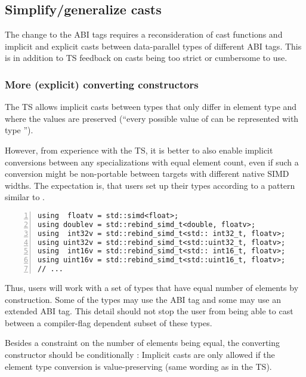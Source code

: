 \subsection{Simplify/generalize casts}\label{sec:casts}

The change to the ABI tags requires a reconsideration of cast functions and
implicit and explicit casts between data-parallel types of different ABI tags.
This is in addition to TS feedback on casts being too strict or cumbersome to use.

\subsubsection{More (explicit) converting constructors}

The TS allows implicit casts between  types that only
differ in element type and where the values are preserved (“every possible
value of  can be represented with type ”).

However, from experience with the TS, it is better to also enable implicit
conversions between any  specializations with equal element count,
even if such a conversion might be non-portable between targets with different
native SIMD widths.
The expectation is, that users set up their types according to a pattern
similar to .
\begin{lstlisting}[numbers=left,float={hbtp},label=lst:simdtypespattern,caption={
  Recommended setup of \code{simd} types
}]
using  floatv = std::simd<float>;
using doublev = std::rebind_simd_t<double, floatv>;
using  int32v = std::rebind_simd_t<std:: int32_t, floatv>;
using uint32v = std::rebind_simd_t<std::uint32_t, floatv>;
using  int16v = std::rebind_simd_t<std:: int16_t, floatv>;
using uint16v = std::rebind_simd_t<std::uint16_t, floatv>;
// ...
\end{lstlisting}
Thus, users will work with a set of types that have equal number of elements by
construction.
Some of the types may use the  ABI tag and some may use an
extended ABI tag.
This detail should not stop the user from being able to cast between a
compiler-flag dependent subset of these types.

Besides a constraint on the number of elements being equal, the converting
constructor should be conditionally :
Implicit casts are only allowed if the element type conversion is
value-preserving (same wording as in the TS).

